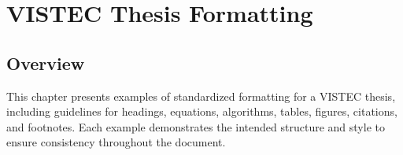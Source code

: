 \chapter{VISTEC Thesis Formatting}
\label{chapter4}

\section{Overview}
\begin{paragraph}
This chapter presents examples of standardized formatting for a VISTEC thesis, including guidelines for headings, equations, algorithms, tables, figures, citations, and footnotes. Each example demonstrates the intended structure and style to ensure consistency throughout the document.
\end{paragraph}






